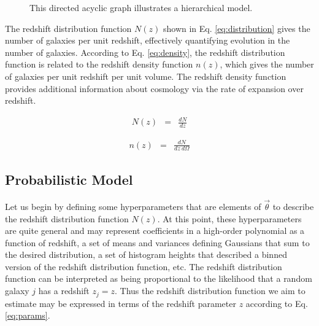 \documentclass[preprint]{aastex}
\begin{document}
\begin{figure}
\vspace{0.5cm}
\begin{center}
\caption{This directed acyclic graph illustrates a hierarchical model.}
\label{fig:flow}
\end{center}
\end{figure}

The redshift distribution function $N(z)$ shown in Eq. \ref{eq:distribution} gives the number of galaxies per unit redshift, effectively quantifying evolution in the number of galaxies.  \citep{men13}  According to Eq. \ref{eq:density}, the redshift distribution function is related to the redshift density function $n(z)$, which gives the number of galaxies per unit redshift per unit volume.  The redshift density function provides additional information about cosmology via the rate of expansion over redshift.

\begin{eqnarray}
\label{eq:distribution}
N(z) &=& \frac{dN}{dz}
\end{eqnarray}

\begin{eqnarray}
\label{eq:density}
n(z) &=& \frac{dN}{dz\ d\Omega}
\end{eqnarray}

\subsection{Probabilistic Model}
\label{sec:prob}

Let us begin by defining some hyperparameters that are elements of $\vec{\theta}$ to describe the redshift distribution function $N(z)$.  At this point, these hyperparameters are quite general and may represent coefficients in a high-order polynomial as a function of redshift, a set of means and variances defining Gaussians that sum to the desired distribution, a set of histogram heights that described a binned version of the redshift distribution function, etc.  The redshift distribution function can be interpreted as being proportional to the likelihood that a random galaxy $j$ has a redshift $z_{j}=z$.  Thus the redshift distribution function we aim to estimate may be expressed in terms of the redshift parameter $z$ according to Eq. \ref{eq:params}.
\end{document}
